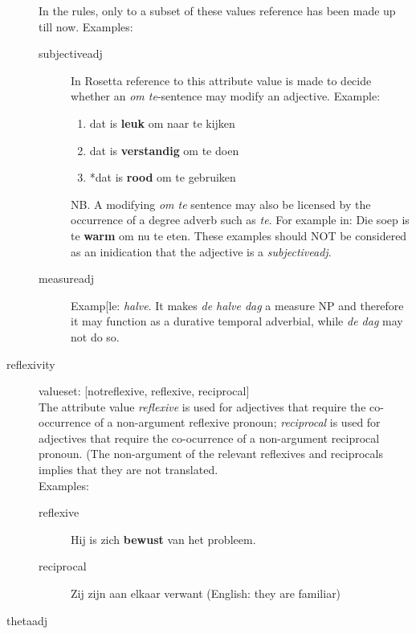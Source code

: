 \begin{description}
In the rules, only to a subset of these values reference has been made 
up till now. 
Examples:\\
\begin{description}
  \item [subjectiveadj] In Rosetta reference to this attribute value is made 
to decide whether an {\em om te}-sentence may modify an adjective.
Example:\\
\begin{enumerate}
  \item  dat is {\bf leuk} om naar te kijken
  \item  dat is {\bf verstandig} om te doen
  \item  *dat is {\bf rood} om te gebruiken
\end{enumerate}
NB. A modifying {\em om te} sentence may also be licensed by the
occurrence of a degree adverb such as {\em te}. 
For example in: Die soep is te {\bf warm} om nu te eten.
These examples should NOT be considered as an inidication 
that the  adjective is a {\em subjectiveadj}.

  \item [measureadj]Examp[le:  {\em  halve}. 
It makes {\em de halve dag} a measure NP
and therefore it may function as a durative temporal adverbial, while {\em de 
dag} may not do so.
\end{description}

\newpage
\item
[reflexivity]\mbox{}

   valueset: [notreflexive, reflexive, reciprocal]\\


The attribute value {\em reflexive} is used for 
adjectives that require the co-occurrence of a non-argument 
reflexive pronoun; {\em 
reciprocal} is used for adjectives 
that require the co-ocurrence of a non-argument reciprocal pronoun.
(The non-argument of the relevant reflexives and reciprocals
implies that they are not translated.\\

Examples: 
\begin{description}
  \item[reflexive] Hij is zich {\bf bewust} van het probleem.
  \item[reciprocal] Zij zijn aan elkaar verwant (English: they are familiar)
\end{description}

\newpage
\item 
[thetaadj]\mbox{}


\end{description}
